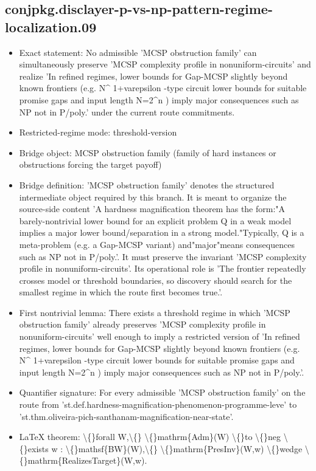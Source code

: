 \documentclass[11pt]{article}
\begin{document}
\subsection*{conjpkg.disclayer-p-vs-np-pattern-regime-localization.09}
\begin{itemize}
\item Exact statement: No admissible 'MCSP obstruction family' can simultaneously preserve 'MCSP complexity profile in nonuniform-circuits' and realize 'In refined regimes, lower bounds for Gap-MCSP slightly beyond known frontiers (e.g. N\textasciicircum{} 1+varepsilon -type circuit lower bounds for suitable promise gaps and input length N=2\textasciicircum{}n ) imply major consequences such as NP not in P/poly.' under the current route commitments.
\item Restricted-regime mode: threshold-version
\item Bridge object: MCSP obstruction family (family of hard instances or obstructions forcing the target payoff)
\item Bridge definition: 'MCSP obstruction family' denotes the structured intermediate object required by this branch. It is meant to organize the source-side content 'A hardness magnification theorem has the form:"A barely-nontrivial lower bound for an explicit problem Q in a weak model implies a major lower bound/separation in a strong model."Typically, Q is a meta-problem (e.g. a Gap-MCSP variant) and"major"means consequences such as NP not in P/poly.'. It must preserve the invariant 'MCSP complexity profile in nonuniform-circuits'. Its operational role is 'The frontier repeatedly crosses model or threshold boundaries, so discovery should search for the smallest regime in which the route first becomes true.'.
\item First nontrivial lemma: There exists a threshold regime in which 'MCSP obstruction family' already preserves 'MCSP complexity profile in nonuniform-circuits' well enough to imply a restricted version of 'In refined regimes, lower bounds for Gap-MCSP slightly beyond known frontiers (e.g. N\textasciicircum{} 1+varepsilon -type circuit lower bounds for suitable promise gaps and input length N=2\textasciicircum{}n ) imply major consequences such as NP not in P/poly.'.
\item Quantifier signature: For every admissible 'MCSP obstruction family' on the route from 'st.def.hardness-magnification-phenomenon-programme-leve' to 'st.thm.oliveira-pich-santhanam-magnification-near-state'.
\item LaTeX theorem: \textbackslash\{\}forall W,\textbackslash\{\} \textbackslash\{\}mathrm\{Adm\}(W) \textbackslash\{\}to \textbackslash\{\}neg \textbackslash\{\}exists w : \textbackslash\{\}mathsf\{BW\}(W),\textbackslash\{\} \textbackslash\{\}mathrm\{PresInv\}(W,w) \textbackslash\{\}wedge \textbackslash\{\}mathrm\{RealizesTarget\}(W,w).

\end{itemize}
\end{document}
